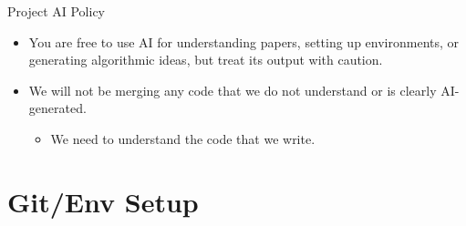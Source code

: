 \documentclass[aspectratio=169, handout]{beamer}
\begin{document}
\begin{frame}{Project AI Policy}
    \begin{itemize}
        \item You are free to use AI for understanding papers, setting up environments, or generating algorithmic ideas, but treat its output with caution.
        \item We will not be merging any code that we do not understand or is clearly AI-generated.
              \begin{itemize}
                  \item We need to understand the code that we write.
              \end{itemize}
    \end{itemize}
\end{frame}

\section{Git/Env Setup}
\frame{\sectionpage}
\end{document}
